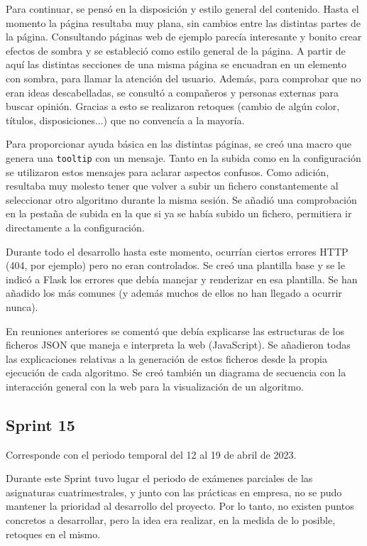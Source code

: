 Para continuar, se pensó en la disposición y estilo general del contenido. Hasta
el momento la página resultaba muy plana, sin cambios entre las distintas partes
de la página. Consultando páginas web de ejemplo parecía interesante y bonito
crear efectos de sombra y se estableció como estilo general de la página. A
partir de aquí las distintas secciones de una misma página se encuadran en un
elemento con sombra, para llamar la atención del usuario. Además, para comprobar
que no eran ideas descabelladas, se consultó a compañeros y personas externas
para buscar opinión. Gracias a esto se realizaron retoques (cambio de algún
color, títulos, disposiciones...) que no convencía a la mayoría.


Para proporcionar ayuda básica en las distintas páginas, se creó una macro que
genera una \texttt{tooltip} con un mensaje. Tanto en la subida como en la
configuración se utilizaron estos mensajes para aclarar aspectos confusos. Como
adición, resultaba muy molesto tener que volver a subir un fichero
constantemente al seleccionar otro algoritmo durante la misma sesión. Se añadió
una comprobación en la pestaña de subida en la que si ya se había subido un
fichero, permitiera ir directamente a la configuración.

Durante todo el desarrollo hasta este momento, ocurrían ciertos errores HTTP
(404, por ejemplo) pero no eran controlados. Se creó una plantilla base y se le
indicó a Flask los errores que debía manejar y renderizar en esa plantilla. Se
han añadido los más comunes (y además muchos de ellos no han llegado a ocurrir
nunca).

En reuniones anteriores se comentó que debía explicarse las estructuras de los
ficheros JSON que maneja e interpreta la web (JavaScript). Se añadieron todas
las explicaciones relativas a la generación de estos ficheros desde la propia
ejecución de cada algoritmo. Se creó también un diagrama de secuencia con la
interacción general con la web para la visualización de un algoritmo.

\subsection{Sprint 15}
Corresponde con el periodo temporal del 12 al 19 de abril de 2023.

Durante este Sprint tuvo lugar el periodo de exámenes parciales de las
asignaturas cuatrimestrales, y junto con las prácticas en empresa, no se pudo
mantener la prioridad al desarrollo del proyecto. Por lo tanto, no existen
puntos concretos a desarrollar, pero la idea era realizar, en la medida de lo
posible, retoques en el mismo.


